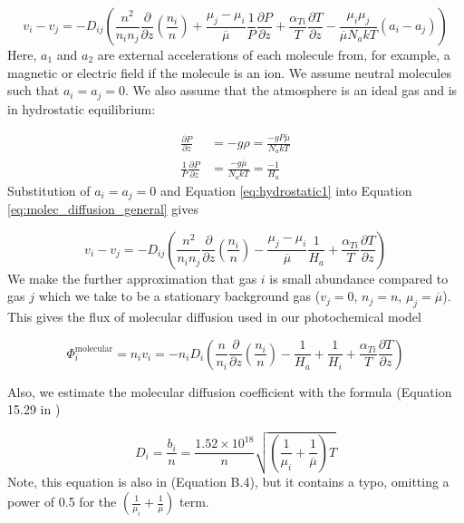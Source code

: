 \begin{equation} \label{eq:molec_diffusion_general}
  v_i - v_j = -D_{ij} \left( \frac{n^2}{n_i n_j} \frac{\partial}{\partial z} \left(\frac{n_i}{n}\right) + \frac{\mu_j - \mu_i}{\overline{\mu}} \frac{1}{P} \frac{\partial P}{\partial z} + \frac{\alpha_{Ti}}{T} \frac{\partial T}{\partial z} - \frac{\mu_i \mu_j}{\overline{\mu} N_a k T} (a_i - a_j)\right)
\end{equation}
Here, $a_1$ and $a_2$ are external accelerations of each molecule from, for example, a magnetic or electric field if the molecule is an ion. We assume neutral molecules such that $a_i = a_j = 0$. We also assume that the atmosphere is an ideal gas and is in hydrostatic equilibrium:

\begin{align} 
  \frac{\partial P}{\partial z} &= -g \rho = \frac{-g P \overline{\mu}}{N_a k T} \\
  \frac{1}{P}\frac{\partial P}{\partial z} &= \frac{-g \overline{\mu}}{N_a k T} = \frac{-1}{H_a} \label{eq:hydrostatic1}
\end{align}
Substitution of $a_i = a_j = 0$ and Equation \eqref{eq:hydrostatic1} into Equation \eqref{eq:molec_diffusion_general} gives

\begin{equation} \label{eq:molec_diffusion_simplify1}
  v_i - v_j = -D_{ij} \left( \frac{n^2}{n_i n_j} \frac{\partial}{\partial z} \left(\frac{n_i}{n}\right) - \frac{\mu_j - \mu_i}{\overline{\mu}} \frac{1}{H_a} + \frac{\alpha_{Ti}}{T} \frac{\partial T}{\partial z} \right)
\end{equation}
We make the further approximation that gas $i$ is small abundance compared to gas $j$ which we take to be a stationary background gas ($v_j = 0$, $n_j = n$, $\mu_j = \overline{\mu}$). This gives the flux of molecular diffusion used in our photochemical model

\begin{equation} \label{eq:phi_molec_diffusion}
  \Phi_i^\text{molecular} = n_i v_i = -n_i D_{i} \left( \frac{n}{n_i} \frac{\partial}{\partial z} \left(\frac{n_i}{n}\right) - \frac{1}{H_a} + \frac{1}{H_i} + \frac{\alpha_{Ti}}{T} \frac{\partial T}{\partial z} \right)
\end{equation}

Also, we estimate the molecular diffusion coefficient with the formula (Equation 15.29 in \citet{Banks_2013})

\begin{equation} \label{eq:molec_diffusion_coeff}
  D_i = 
  \frac{b_i}{n} = \frac{1.52 \times 10^{18}}{n} \sqrt{\left( \frac{1}{\mu_i} + \frac{1}{\overline{\mu}} \right) T}
\end{equation}
Note, this equation is also in \citet{Catling_2017} (Equation B.4), but it contains a typo, omitting a power of 0.5 for the $\left( \frac{1}{\mu_i} + \frac{1}{\overline{\mu}} \right)$ term.

